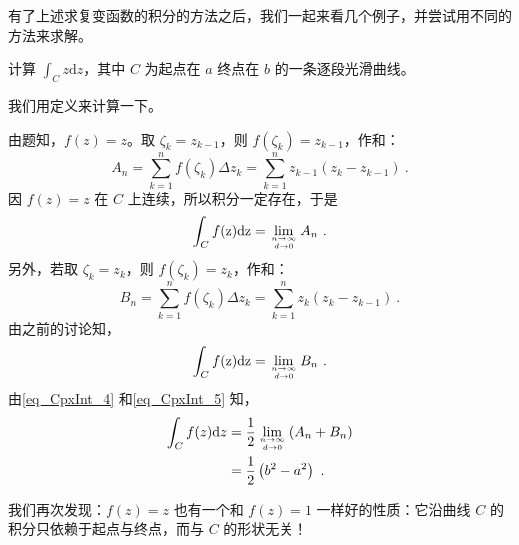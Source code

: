有了上述求复变函数的积分的方法之后，我们一起来看几个例子，并尝试用不同的方法来求解。
\begin{example}{}
计算 $\displaystyle \int _ C z \mathrm dz$，其中 $C$ 为起点在 $a$ 终点在 $b$ 的一条逐段光滑曲线。

我们用定义来计算一下。

由题知，$f(z)=z$。取 $\zeta_k=z_{k-1}$，则 $f\left(\zeta_{k}\right)=z_{k-1}$，作和：
\begin{equation}
A_{n}=\sum_{k=1}^{n} f\left(\zeta_{k}\right) \Delta z_{k}=\sum_{k=1}^{n} z_{k-1}\left(z_{k}-z_{k-1}\right)~.
\end{equation}
因 $f(z)=z$ 在 $C$ 上连续，所以积分一定存在，于是
\begin{equation} \label{eq_CpxInt_4}
\int_{C} f(\mathrm{z}) \mathrm{d} \mathrm{z}=\lim _{n \rightarrow \infty \atop d \rightarrow 0} A_{n}~.
\end{equation}
另外，若取 $\zeta_k=z_k$，则 $f\left(\zeta_{k}\right)=z_{k}$，作和：
\begin{equation}
B_{n}=\sum_{k=1}^{n} f\left(\zeta_{k}\right) \Delta z_{k}=\sum_{k=1}^{n} z_{k}\left(z_{k}-z_{k-1}\right)~.
\end{equation}
由之前的讨论知，
\begin{equation}\label{eq_CpxInt_5}
\int_{C} f(\mathrm{z}) \mathrm{d} \mathrm{z}=\lim _{n \rightarrow \infty \atop d \rightarrow 0} B_{n}~.
\end{equation}
由\autoref{eq_CpxInt_4} 和\autoref{eq_CpxInt_5} 知，
\begin{equation}
\begin{aligned} \int_{C} f(z) \mathrm{d} z &=\frac{1}{2} \lim _{n \rightarrow \infty \atop d \rightarrow 0}\left(A_{n}+B_{n}\right) \\ &=\frac{1}{2}\left(b^{2}-a^{2}\right)~. \end{aligned}
\end{equation}
\end{example}
我们再次发现：$f (z) = z$ 也有一个和 $f(z)=1$ 一样好的性质：它沿曲线 $C$ 的积分只依赖于起点与终点，而与 $C $ 的形状无关！

